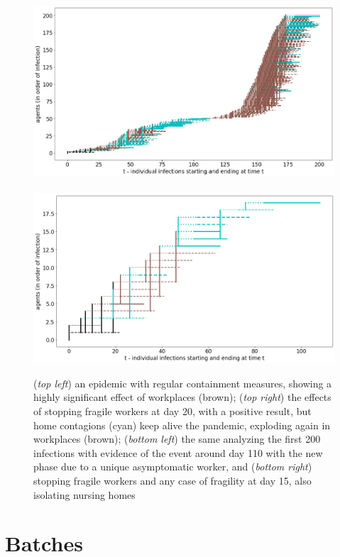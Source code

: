 \documentclass[8pt]{beamer}
\begin{document}
\begin{frame}{}
\begin{figure}[H]
\center
\includegraphics[scale=0.105]{withShort1A200.png}~~~~~~~~~~~\includegraphics[scale=0.105]{withShort1B.png} \\
\caption{(\emph{top left}) an epidemic with regular containment measures, showing a highly significant effect of workplaces (brown);
 (\emph{top right}) the effects of stopping fragile workers at day 20, with a positive result, but home contagions (cyan) keep alive the pandemic, exploding again in workplaces (brown); (\emph{bottom left}) the same analyzing the first 200 infections with evidence of the event around day 110 with the new phase due to a unique asymptomatic worker, and (\emph{bottom right}) stopping fragile workers and any case of fragility at day 15, also isolating nursing homes} 
\label{fourSequences}
\end{figure}

\end{frame}

\section{Batches}
\end{document}
